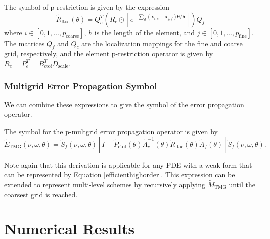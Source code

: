 \documentclass[review]{siamart190516}
\begin{document}
\begin{definition}
The symbol of p-restriction is given by the expression
\begin{equation}
\tilde{R}_{\text{ftoc}} \left( \theta \right) = Q_c^T \left( R_e \odot \left[ e^{\imath \sum_d \left( \mathbf{x}_{i, c} - \mathbf{x}_{j, f} \right) \mathbf{\theta} / \mathbf{h}} \right] \right) Q_f
\end{equation}
where $i \in \left[ 0, 1, \dots, p_{\text{coarse}} \right]$, $h$ is the length of the element, and $j \in \left[ 0, 1, \dots, p_{\text{fine}} \right]$.
The matrices $Q_f$ and $Q_c$ are the localization mappings for the fine and coarse grid, respectively, and the element p-restriction operator is given by $R_e = P_e^T = B_{\text{ctof}}^T D_{\text{scale}}$.
\end{definition}\label{def:restriction_symbol}

\subsubsection{Multigrid Error Propagation Symbol}\label{sec:multigridsymbol}

We can combine these expressions to give the symbol of the error propagation operator.

\begin{definition}
The symbol for the p-multgrid error propagation operator is given by
\begin{equation}
\tilde{E}_{\text{TMG}} \left( \nu, \omega, \theta \right) = \tilde{S}_f \left( \nu, \omega, \theta \right) \left[ I - \tilde{P}_{\text{ctof}} \left( \theta \right) \tilde{A}_c^{-1} \left( \theta \right) \tilde{R}_{\text{ftoc}} \left( \theta \right) \tilde{A}_f \left( \theta \right) \right] \tilde{S}_f \left( \nu, \omega, \theta \right).
\end{equation}
\end{definition}\label{def:pmultigrid_symbol}

Note again that this derivation is applicable for any PDE with a weak form that can be represented by Equation \ref{efficienthighorder}.
This expression can be extended to represent multi-level schemes by recursively applying $\tilde{M}_{\text{TMG}}$ until the coarsest grid is reached.

\section{Numerical Results}\label{sec:results}
\end{document}
